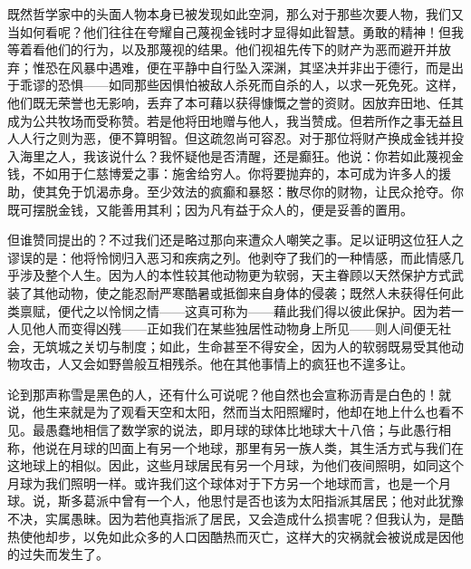 既然哲学家中的头面人物本身已被发现如此空洞，那么对于那些次要人物，我们又当如何看呢？他们往往在夸耀自己蔑视金钱时才显得如此智慧。勇敢的精神！但我等着看他们的行为，以及那蔑视的结果。他们视祖先传下的财产为恶而避开并放弃；惟恐在风暴中遇难，便在平静中自行坠入深渊，其坚决并非出于德行，而是出于乖谬的恐惧——如同那些因惧怕被敌人杀死而自杀的人，以求一死免死。这样，他们既无荣誉也无影响，丢弃了本可藉以获得慷慨之誉的资财。因放弃田地、任其成为公共牧场而受称赞。若是他将田地赠与他人，我当赞成。但若所作之事无益且人人行之则为恶，便不算明智。但这疏忽尚可容忍。对于那位将财产换成金钱并投入海里之人，我该说什么？我怀疑他是否清醒，还是癫狂。他说：你若如此蔑视金钱，不如用于仁慈博爱之事：施舍给穷人。你将要抛弃的，本可成为许多人的援助，使其免于饥渴赤身。至少效法的疯癫和暴怒：散尽你的财物，让民众抢夺。你既可摆脱金钱，又能善用其利；因为凡有益于众人的，便是妥善的置用。\par

但谁赞同提出的？不过我们还是略过那向来遭众人嘲笑之事。足以证明这位狂人之谬误的是：他将怜悯归入恶习和疾病之列。他剥夺了我们的一种情感，而此情感几乎涉及整个人生。因为人的本性较其他动物更为软弱，天主眷顾以天然保护方式武装了其他动物，使之能忍耐严寒酷暑或抵御来自身体的侵袭；既然人未获得任何此类禀赋，便代之以怜悯之情——这真可称为——藉此我们得以彼此保护。因为若一人见他人而变得凶残——正如我们在某些独居性动物身上所见——则人间便无社会，无筑城之关切与制度；如此，生命甚至不得安全，因为人的软弱既易受其他动物攻击，人又会如野兽般互相残杀。他在其他事情上的疯狂也不遑多让。\par

论到那声称雪是黑色的人，还有什么可说呢？他自然也会宣称沥青是白色的！就说，他生来就是为了观看天空和太阳，然而当太阳照耀时，他却在地上什么也看不见。最愚蠢地相信了数学家的说法，即月球的球体比地球大十八倍；与此愚行相称，他说在月球的凹面上有另一个地球，那里有另一族人类，其生活方式与我们在这地球上的相似。因此，这些月球居民有另一个月球，为他们夜间照明，如同这个月球为我们照明一样。或许我们这个球体对于下方另一个地球而言，也是一个月球。说，斯多葛派中曾有一个人，他思忖是否也该为太阳指派其居民；他对此犹豫不决，实属愚昧。因为若他真指派了居民，又会造成什么损害呢？但我认为，是酷热使他却步，以免如此众多的人口因酷热而灭亡，这样大的灾祸就会被说成是因他的过失而发生了。\par


